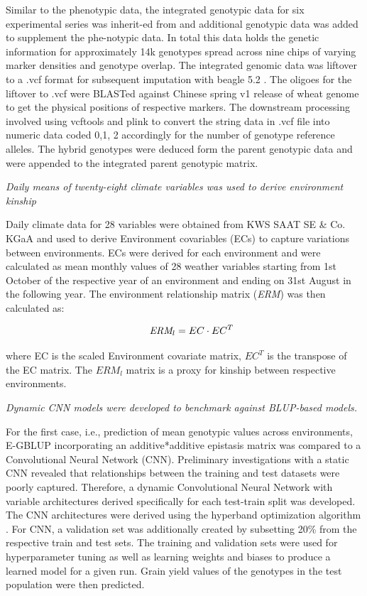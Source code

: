 \documentclass[english, biblatex]{lni}
\begin{document}
Similar to the phenotypic data, the integrated genotypic data for six experimental series was inherit-ed from \cite{zhao2021unlocking} and additional genotypic data was added to supplement the phe-notypic data. In total this data holds the genetic information for approximately 14k genotypes spread across nine chips of varying marker densities and genotype overlap. The integrated genomic data was liftover to a .vcf format \cite{danecek2011variant} for subsequent imputation with beagle 5.2 \cite{browning2018one}. The oligoes \cite{wang2014characterization} for the liftover to .vcf were BLASTed against Chinese spring v1 release of wheat genome to get the physical positions of respective markers. The downstream processing involved using vcftools \cite{danecek2011variant} and plink \cite{purcell2007plink} to convert the string data in .vcf file into numeric data coded 0,1, 2 accordingly for the number of genotype reference alleles. The hybrid genotypes were deduced form the parent genotypic data and were appended to the integrated parent genotypic matrix.

\textit{Daily means of twenty-eight climate variables was used to derive environment kinship}

Daily climate data for 28 variables were obtained from KWS SAAT SE \& Co. KGaA and used to derive Environment covariables (ECs) to capture variations between environments. ECs were derived for each environment and were calculated as mean monthly values of 28 weather variables starting from 1st October of the respective year of an environment and ending on 31st August in the following year.
The environment relationship matrix (\textit{ERM}) was then calculated as:

\begin{equation}
\hspace{0.5cm}\textit{ERM}_l = EC \cdot EC^T
\end{equation}

where EC is the scaled Environment covariate matrix, $EC^T$ is the transpose of the EC matrix. The $\textit{ERM}_l$ matrix is a proxy for kinship between respective environments.

\textit{Dynamic CNN models were developed to benchmark against BLUP-based models.}

For the first case, i.e., prediction of mean genotypic values across environments, E-GBLUP incorporating an additive*additive epistasis matrix \cite{jiang2015modeling} was compared to a Convolutional Neural Network (CNN). Preliminary investigations with a static CNN revealed that relationships between the training and test datasets were poorly captured. Therefore, a dynamic Convolutional Neural Network with variable architectures derived specifically for each test-train split was developed. The CNN architectures were derived using the hyperband optimization algorithm \cite{li_hyperband_2018}. For CNN, a validation set was additionally created by subsetting 20\% from the respective train and test sets. The training and validation sets were used for hyperparameter tuning as well as learning weights and biases to produce a learned model for a given run. Grain yield values of the genotypes in the test population were then predicted.
\end{document}
